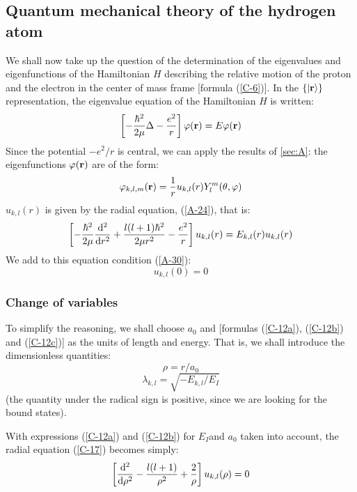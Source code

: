 \subsection{Quantum mechanical theory of the hydrogen atom}\label{sec:C-3}
We shall now take up the question of the determination of the eigenvalues and eigenfunctions of the Hamiltonian $H$ describing the relative motion of the proton and
the electron in the center of mass frame [formula (\ref{C-6})]. In the $\{\ket{\vb{r}}\}$ representation, the eigenvalue equation of the Hamiltonian $H$ is written:
\begin{equation}\label{C-15}
	\left[-\frac{\hbar^2}{2\mu}\Delta -\frac{e^2}{r}\right]\varphi(\vb{r})=E\varphi(\vb{r})
\end{equation}
Since the potential $-e^2/r$ is central, we can apply the results of \ref{sec:A}: the eigenfunctions $\varphi(\vb{r})$ are of the form:
\begin{equation}\label{C-16}
	\varphi_{k,l,m}(\vb{r})=\frac{1}{r}u_{k,l}(r)Y_l^m(\theta,\varphi)
\end{equation}
$u_{k,l}(r)$ is given by the radial equation, (\ref{A-24}), that is:
\begin{equation}\label{C-17}
	\left[-\frac{\hbar^2}{2\mu}\dv[2]{r}+\frac{l(l+1)\hbar^2}{2\mu r^2}-\frac{e^2}{r}\right]u_{k,l}(r)=E_{k,l}(r)u_{k,l}(r)
\end{equation}
We add to this equation condition (\ref{A-30}):
\begin{equation}\label{C-18}
	u_{k,l}(0)=0
\end{equation}

\subsubsection{Change of variables}
To simplify the reasoning, we shall choose $a_0$ and [formulas (\ref{C-12a}), (\ref{C-12b}) and (\ref{C-12c})] as the units of length and energy. That is, we shall introduce the dimensionless quantities:
\begin{equation}\label{C-19}
	\rho = r/a_0
\end{equation}
\begin{equation}\label{C-20}
	\lambda_{k,l}=\sqrt{-E_{k,l}/E_I}
\end{equation}
(the quantity under the radical sign is positive, since we are looking for the bound states).

With expressions (\ref{C-12a}) and (\ref{C-12b}) for $E_I $and $a_0$ taken into account, the radial equation (\ref{C-17}) becomes simply:
\begin{equation}\label{C-21}
	\left[\dv[2]{\rho}-\frac{l(l+1)}{\rho^2}+\frac{2}{\rho}\right]u_{k,l}(\rho)=0
\end{equation}

